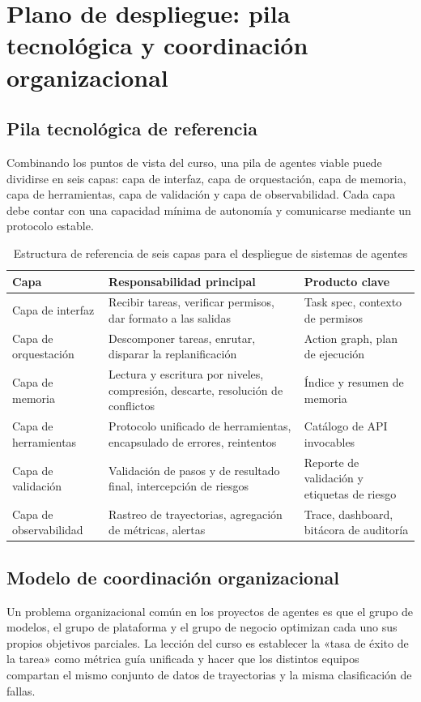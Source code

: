 \section{Plano de despliegue: pila tecnológica y coordinación organizacional}

\subsection{Pila tecnológica de referencia}
Combinando los puntos de vista del curso, una pila de agentes viable puede dividirse en seis capas: capa de interfaz, capa de orquestación, capa de memoria, capa de herramientas, capa de validación y capa de observabilidad. Cada capa debe contar con una capacidad mínima de autonomía y comunicarse mediante un protocolo estable.

\begin{table}[H]
\centering
\begin{tabular}{p{2.4cm}p{4.0cm}p{4.6cm}}
\toprule
\textbf{Capa} & \textbf{Responsabilidad principal} & \textbf{Producto clave} \\
\midrule
Capa de interfaz & Recibir tareas, verificar permisos, dar formato a las salidas & Task spec, contexto de permisos \\
Capa de orquestación & Descomponer tareas, enrutar, disparar la replanificación & Action graph, plan de ejecución \\
Capa de memoria & Lectura y escritura por niveles, compresión, descarte, resolución de conflictos & Índice y resumen de memoria \\
Capa de herramientas & Protocolo unificado de herramientas, encapsulado de errores, reintentos & Catálogo de API invocables \\
Capa de validación & Validación de pasos y de resultado final, intercepción de riesgos & Reporte de validación y etiquetas de riesgo \\
Capa de observabilidad & Rastreo de trayectorias, agregación de métricas, alertas & Trace, dashboard, bitácora de auditoría \\
\bottomrule
\end{tabular}
\caption{Estructura de referencia de seis capas para el despliegue de sistemas de agentes}
\end{table}

\subsection{Modelo de coordinación organizacional}
Un problema organizacional común en los proyectos de agentes es que el grupo de modelos, el grupo de plataforma y el grupo de negocio optimizan cada uno sus propios objetivos parciales. La lección del curso es establecer la «tasa de éxito de la tarea» como métrica guía unificada y hacer que los distintos equipos compartan el mismo conjunto de datos de trayectorias y la misma clasificación de fallas.

